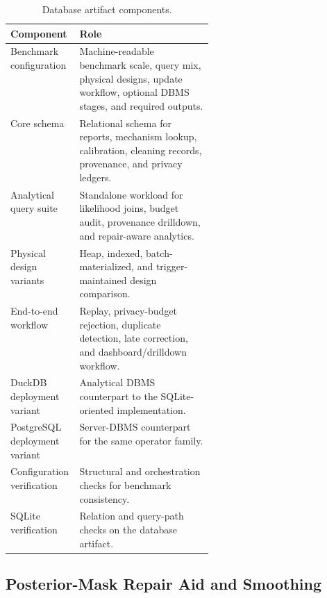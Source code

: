 \documentclass[conference]{IEEEtran}
\begin{document}
\begin{table}[t]
\centering
\caption{Database artifact components.}
\label{tab:db_artifact_components}
\scriptsize
\setlength{\tabcolsep}{2pt}
\renewcommand{\arraystretch}{0.9}
\begin{tabularx}{\columnwidth}{p{0.34\linewidth}Y}
\toprule
Component & Role \\
\midrule
Benchmark configuration & Machine-readable benchmark scale, query mix, physical designs, update workflow, optional DBMS stages, and required outputs. \\
Core schema & Relational schema for reports, mechanism lookup, calibration, cleaning records, provenance, and privacy ledgers. \\
Analytical query suite & Standalone workload for likelihood joins, budget audit, provenance drilldown, and repair-aware analytics. \\
Physical design variants & Heap, indexed, batch-materialized, and trigger-maintained design comparison. \\
End-to-end workflow & Replay, privacy-budget rejection, duplicate detection, late correction, and dashboard/drilldown workflow. \\
DuckDB deployment variant & Analytical DBMS counterpart to the SQLite-oriented implementation. \\
PostgreSQL deployment variant & Server-DBMS counterpart for the same operator family. \\
Configuration verification & Structural and orchestration checks for benchmark consistency. \\
SQLite verification & Relation and query-path checks on the database artifact. \\
\bottomrule
\end{tabularx}
\end{table}

\subsection{Posterior-Mask Repair Aid and Smoothing}
\label{sec:repair}
\end{document}
